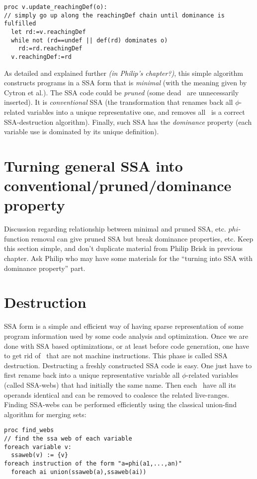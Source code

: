 {\begin{verbatim}
proc v.update_reachingDef(o):
// simply go up along the reachingDef chain until dominance is fulfilled 
  let rd:=v.reachingDef
  while not (rd==undef || def(rd) dominates o)
    rd:=rd.reachingDef
  v.reachingDef:=rd
\end{verbatim}

As detailed and explained further \emph{(in Philip's chapter?)}, this simple algorithm constructs programs in a SSA form that is \textit{minimal} (with the meaning given by Cytron et al.).
The SSA code could be \textit{pruned} (some dead \phiops\ are unnecessarily inserted).
It is \textit{conventional} SSA (the transformation that renames back all $\phi$-related variables into a unique representative one, and removes all \phiops\ is a correct SSA-destruction algorithm).
Finally, such SSA has the \textit{dominance} property (each variable use is dominated by its unique definition).

\section{Turning general SSA into conventional/pruned/dominance property}

Discussion regarding relationship between minimal and pruned SSA, etc.
$phi$-function removal can give pruned SSA but break
dominance properties, etc. Keep this section simple, and don't duplicate
material from Philip Brisk in previous chapter.
Ask Philip who may have some materials for the ``turning into SSA with dominance property'' part.


\section{Destruction }
\label{sec:classical_destruction}

SSA form is a simple and efficient way of having sparse representation of some program information used by some code analysis and optimization. Once we are done with SSA based optimizations, or at least before code generation, one have to get rid of \phiops\ that are not machine instructions. This phase is called SSA destruction. 
Destructing a freshly constructed SSA code is easy. One just have to first rename back into a unique representative variable all $\phi$-related variables (called SSA-webs) that had initially the same name. Then each \phiop\ have all its operands identical and can be removed to coalesce the related live-ranges.
Finding SSA-webs can be performed efficiently using the classical union-find algorithm for merging sets:
\begin{verbatim}
proc find_webs
// find the ssa web of each variable
foreach variable v:
  ssaweb(v) := {v}
foreach instruction of the form "a=phi(a1,...,an)"
  foreach ai union(ssaweb(a),ssaweb(ai))
\end{verbatim}

}
